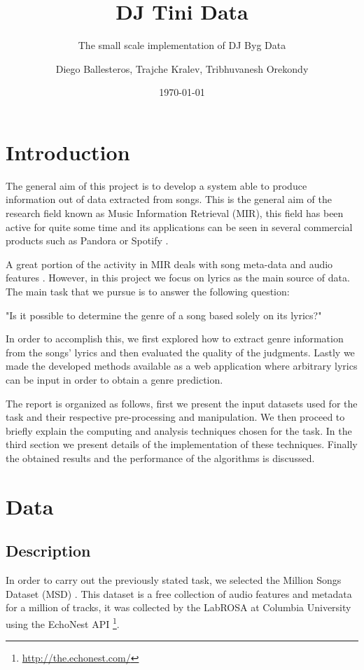 \documentclass[10pt,a4paper]{scrartcl}
\author{Diego Ballesteros, Trajche Kralev, Tribhuvanesh Orekondy}
\title{DJ Tini Data}
\subtitle{The small scale implementation of DJ Byg Data}
\date{\today}
\begin{document}
  \maketitle
  \section{Introduction}
    The general aim of this project is to develop a system able to produce
    information out of data extracted from songs. This is the general
    aim of the research field known as Music Information Retrieval (MIR),
    this field has been active for quite some time \cite{nameThatTune:1993}
    and its applications can be seen in several commercial products such as
    Pandora or Spotify \cite{recommendation:2010}.

    A great portion of the activity in MIR deals with song meta-data and audio
    features \cite{McFee:2012:MSD:2187980.2188222}. However, in this project we
    focus on lyrics as the main source of data.
    The main task that we pursue is to answer the following question:
    
    "Is it possible to determine the genre of a song based solely on its
    lyrics?"
     
    In order to accomplish this, we first explored how to extract genre
    information from the songs' lyrics and then evaluated the quality of the
    judgments. Lastly we made the developed methods available as a web
    application where arbitrary lyrics can be input in order to obtain
    a genre prediction.
    
    The report is organized as follows, first we present the input datasets used
    for the task and their respective pre-processing and manipulation. We then
    proceed to briefly explain the computing and analysis techniques chosen for
    the task. In the third section we present details of the implementation of
    these techniques. Finally the obtained results and the performance of the
    algorithms is discussed.
  \section{Data}
  
    \subsection{Description} \label{sec:data:subsec:description}
    In order to carry out the previously stated task, we selected the Million
    Songs Dataset (MSD) \cite{Bertin-Mahieux2011}.
    This dataset is a free collection of audio features and metadata for a million
    of tracks, it was collected by the LabROSA at Columbia University using
    the EchoNest API
    \footnote{\url{http://the.echonest.com/}}.
    
\end{document}
